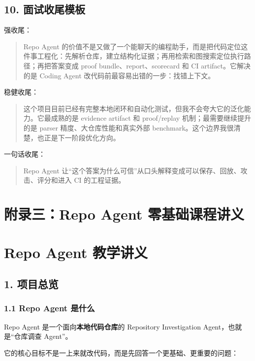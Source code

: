 \documentclass[UTF8,12pt,openany]{ctexbook}
\begin{document}
\section{10. 面试收尾模板}

强收尾：\par

\begin{quote}
Repo Agent 的价值不是又做了一个能聊天的编程助手，而是把代码定位这件事工程化：先解析仓库，建立结构化证据；再用检索和图搜索定位执行路径；再把答案变成 proof bundle、report、scorecard 和 CI artifact。它解决的是 Coding Agent 改代码前最容易出错的一步：找错上下文。
\end{quote}

稳健收尾：\par

\begin{quote}
这个项目目前已经有完整本地闭环和自动化测试，但我不会夸大它的泛化能力。它最成熟的是 evidence artifact 和 proof/replay 机制；最需要继续提升的是 parser 精度、大仓库性能和真实外部 benchmark。这个边界我很清楚，也正是下一阶段优化方向。
\end{quote}

一句话收尾：\par

\begin{quote}
Repo Agent 让“这个答案为什么可信”从口头解释变成可以保存、回放、攻击、评分和进入 CI 的工程证据。
\end{quote}


\clearpage
\chapter{附录三：Repo Agent 零基础课程讲义}

\clearpage
\chapter{Repo Agent 教学讲义}

\section{1. 项目总览}

\subsection{1.1 Repo Agent 是什么}

Repo Agent 是一个面向\textbf{本地代码仓库}的 Repository Investigation Agent，也就是“仓库调查 Agent”。  \par
它的核心目标不是一上来就改代码，而是先回答一个更基础、更重要的问题：\par
\end{document}

